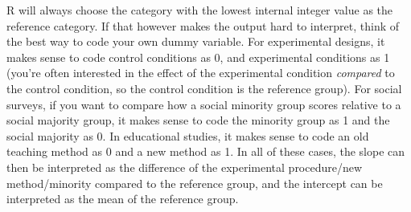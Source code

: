 \documentclass[]{book}\usepackage[]{graphicx}\usepackage[]{color}
\begin{document}
R will always choose the category with the lowest internal integer value as the reference category. If that however makes the output hard to interpret, think of the best way to code your own dummy variable. For experimental designs, it makes sense to code control conditions as 0, and experimental conditions as 1 (you're often interested in the effect of the experimental condition \textit{compared} to the control condition, so the control condition is the reference group). For social surveys, if you want to compare how a social minority group scores relative to a social majority group, it makes sense to code the minority group as 1 and the social majority as 0. In educational studies, it makes sense to code an old teaching method as 0 and a new method as 1. In all of these cases, the slope can then be interpreted as the difference of the experimental procedure/new method/minority compared to the reference group, and the intercept can be interpreted as the mean of the reference group.
\end{document}
